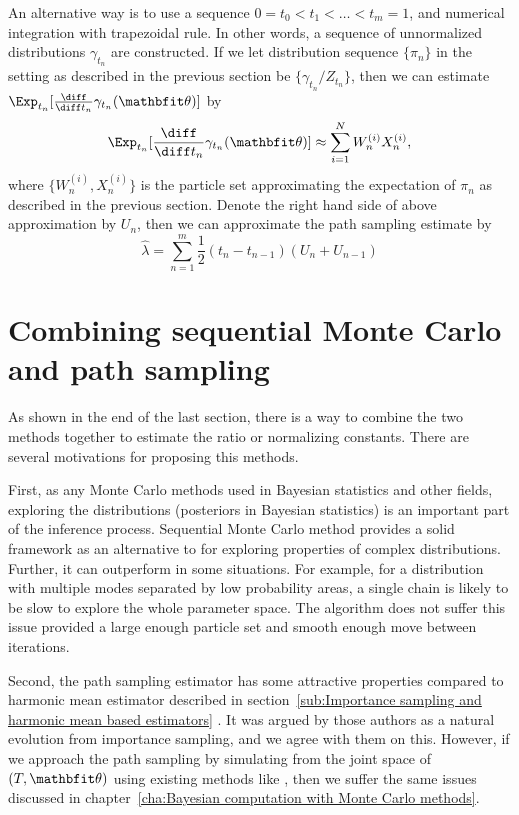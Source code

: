 An alternative way is to use a sequence $0 = t_0 < t_1 < \dots < t_m = 1$, and
numerical integration with trapezoidal rule. In other words, a sequence of
unnormalized distributions $\gamma_{t_n}$ are constructed. If we let
distribution sequence $\{\pi_n\}$ in the \smc setting as described in the
previous section be $\{\gamma_{t_n}/Z_{t_n}\}$, then we can estimate
$\Exp_{t_n}[\frac{\diff}{\diff t_n}\gamma_{t_n}(\bth)]$ by
\begin{equation}
  \Exp_{t_n}[\frac{\diff}{\diff t_n}\gamma_{t_n}(\bth)]
  \approx \sum_{i=1}^NW_n^{(i)}X_n^{(i)},
\end{equation}
where $\{W_n^{(i)},X_n^{(i)}\}$ is the particle set approximating the
expectation of $\pi_n$ as described in the previous section. Denote the right
hand side of above approximation by $U_n$, then we can approximate the path
sampling estimate by
\begin{equation}
  \hat{\lambda} = \sum_{n = 1}^m \frac{1}{2}(t_{n} - t_{n-1})(U_n + U_{n-1})
\end{equation}

\section{Combining sequential Monte Carlo and path sampling}
\label{sec:Combining sequential Monte Carlo and path sampling}

As shown in the end of the last section, there is a way to combine the two
methods together to estimate the ratio or normalizing constants. There are
several motivations for proposing this methods.

First, as any Monte Carlo methods used in Bayesian statistics and other
fields, exploring the distributions (posteriors in Bayesian statistics) is an
important part of the inference process. Sequential Monte Carlo method
provides a solid framework as an alternative to \mcmc for exploring properties
of complex distributions. Further, it can outperform \mcmc in some situations.
For example, for a distribution with multiple modes separated by low
probability areas, a single chain \mha is likely to be slow to explore the
whole parameter space. The \smc algorithm does not suffer this issue provided
a large enough particle set and smooth enough move between iterations.

Second, the path sampling estimator has some attractive properties compared to
harmonic mean estimator described in section~\ref{sub:Importance sampling and
  harmonic mean based estimators} \parencite[see][]{Gelman1998}. It was argued
by those authors as a natural evolution from importance sampling, and we agree
with them on this. However, if we approach the path sampling by simulating
from the joint space of $(T,\bth)$ using existing methods like \mcmc, then
we suffer the same issues discussed in chapter~\ref{cha:Bayesian computation
  with Monte Carlo methods}.

